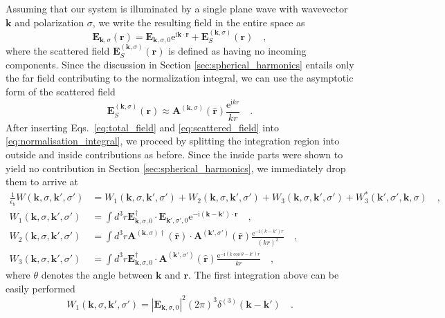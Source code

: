 \documentclass[10pt,letterpaper]{article}
\newcommand{\ii}{\text{i}}
\newcommand{\ee}{\text{e}}
\renewcommand{\vec}[1]{\mathbf{#1}}
\let\oldhat\hat
\renewcommand{\hat}[1]{\oldhat{\vec{#1}}}
\begin{document}
Assuming that our system is illuminated by a single plane wave with wavevector $\vec{k}$ and polarization $\sigma$, we write the resulting field in the entire space as
\begin{equation} \label{eq:total_field}
\vec{E}_{\vec{k},\sigma}(\vec{r}) = \vec{E}_{\vec{k},\sigma,0} \ee^{\ii\vec{k}\cdot\vec{r}} + \vec{E}^{(\vec{k},\sigma)}_{S}(\vec{r}) \quad  ,
\end{equation}
where the scattered field $\vec{E}^{(\vec{k},\sigma)}_{S}(\vec{r})$ is defined as having no incoming components. Since the discussion in Section \ref{sec:spherical_harmonics} entails only the far field contributing to the normalization integral, we can use the asymptotic form of the scattered field
\begin{equation} \label{eq:scattered_field}
\vec{E}^{(\vec{k},\sigma)}_{S}(\vec{r}) \approx \vec{A}^{(\vec{k},\sigma)}(\hat{r})\frac{\ee^{\ii kr}}{kr} \quad .
\end{equation}
After inserting Eqs.~\eqref{eq:total_field} and \eqref{eq:scattered_field} into \eqref{eq:normalisation_integral}, we proceed by splitting the integration region into outside and inside contributions as before. Since the inside parts were shown to yield no contribution in Section \ref{sec:spherical_harmonics}, we immediately drop them to arrive at
\begin{align}\label{eq:norm_integral_plane_wave}
\frac{1}{\epsilon_b}W(\vec{k}, \sigma, \vec{k'}, \sigma') &= W_1(\vec{k}, \sigma, \vec{k'}, \sigma') + W_2(\vec{k}, \sigma, \vec{k'}, \sigma') + W_3(\vec{k}, \sigma, \vec{k'}, \sigma') + W^*_3(\vec{k'}, \sigma', \vec{k}, \sigma) \quad , \\
W_1(\vec{k}, \sigma, \vec{k'}, \sigma') &= \int d^3r \vec{E}^{\dagger}_{\vec{k},\sigma,0} \cdot \vec{E}_{\vec{k'},\sigma',0} \ee^{-\ii(\vec{k}-\vec{k'})\cdot\vec{r}} \quad , \nonumber \\
W_2(\vec{k}, \sigma, \vec{k'}, \sigma') &= \int d^3r \vec{A}^{(\vec{k},\sigma)\dagger}(\hat{r}) \cdot \vec{A}^{(\vec{k'},\sigma')}(\hat{r}) \frac{\ee^{-\ii(k-k')r}}{(kr)^2} \quad , \nonumber  \\
W_3(\vec{k}, \sigma, \vec{k'}, \sigma') &= \int d^3r \vec{E}^{\dagger}_{\vec{k},\sigma,0} \cdot \vec{A}^{(\vec{k'},\sigma')}(\hat{r}) \frac{\ee^{-\ii(k\cos\theta-k')r}}{kr} \quad , \nonumber
\end{align}
where $\theta$ denotes the angle between $\vec{k}$ and $\vec{r}$. The first integration above can be easily performed
\begin{equation}
W_1(\vec{k}, \sigma, \vec{k'}, \sigma') = \left|\vec{E}_{\vec{k},\sigma,0}\right|^2 (2\pi)^3 \delta^{(3)}(\vec{k}-\vec{k'}) \quad .
\end{equation}
\end{document}
